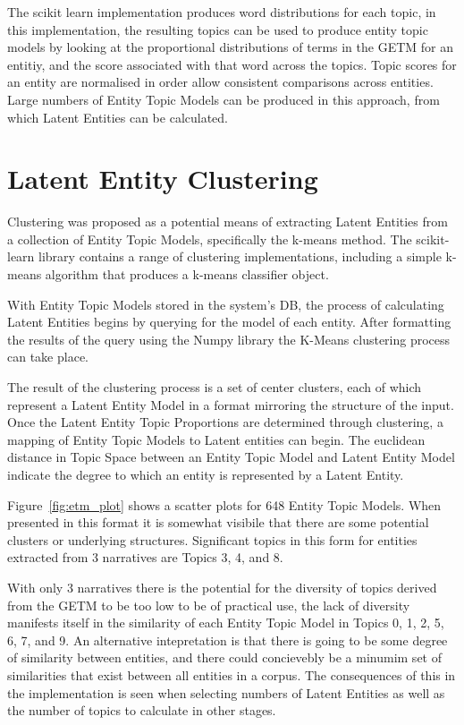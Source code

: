 \documentclass[10pt]{report}
\begin{document}
The scikit learn implementation produces word distributions for each topic, in this implementation, the resulting topics can be used to produce entity topic models by looking at the proportional distributions of terms in the GETM for an entitiy, and the score associated with that word across the topics. Topic scores for an entity are normalised in order allow consistent comparisons across entities. Large numbers of Entity Topic Models can be produced in this approach, from which Latent Entities can be calculated.



\section{Latent Entity Clustering}
Clustering was proposed as a potential means of extracting Latent Entities from a collection of Entity Topic Models, specifically the k-means method. The scikit-learn library contains a range of clustering implementations, including a simple k-means algorithm that produces a k-means classifier object. 

With Entity Topic Models stored in the system's DB, the process of calculating Latent Entities begins by querying for the model of each entity. After formatting the results of the query using the Numpy library the K-Means clustering process can take place.

The result of the clustering process is a set of center clusters, each of which represent a Latent Entity Model in a format mirroring the structure of the input. Once the Latent Entity Topic Proportions are determined through clustering, a mapping of Entity Topic Models to Latent entities can begin. The euclidean distance in Topic Space between an Entity Topic Model and Latent Entity Model indicate the degree to which an entity is represented by a Latent Entity.

Figure~\ref{fig:etm_plot} shows a scatter plots for 648 Entity Topic Models. When presented in this format it is somewhat visibile that there are some potential clusters or underlying structures. Significant topics in this form for entities extracted from 3 narratives are Topics 3, 4, and 8.

With only 3 narratives there is the potential for the diversity of topics derived from the GETM to be too low to be of practical use, the lack of diversity manifests itself in the similarity of each Entity Topic Model in Topics 0, 1, 2, 5, 6, 7, and 9. An alternative intepretation is that there is going to be some degree of similarity between entities, and there could concievebly be a minumim set of similarities that exist between all entities in a corpus. The consequences of this in the implementation is seen when selecting numbers of Latent Entities as well as the number of topics to calculate in other stages.    
\end{document}
